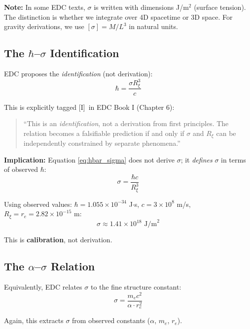 \documentclass[11pt,a4paper]{article}
\newcommand{\Ident}{\textsc{[I]}}
\begin{document}
\textbf{Note:} In some EDC texts, $\sigma$ is written with dimensions J/m$^2$
(surface tension). The distinction is whether we integrate over 4D spacetime
or 3D space. For gravity derivations, we use $[\sigma] = M/L^3$ in natural units.

\subsection{The $\hbar$--$\sigma$ Identification}

EDC proposes the \textit{identification} (not derivation):
\begin{equation}
\boxed{\hbar = \frac{\sigma R_\xi^3}{c}}
\label{eq:hbar_sigma}
\end{equation}

This is explicitly tagged \Ident\ in EDC Book I (Chapter 6):
\begin{quote}
``This is an \textit{identification}, not a derivation from first principles.
The relation becomes a falsifiable prediction if and only if $\sigma$ and
$R_\xi$ can be independently constrained by separate phenomena.''
\end{quote}

\textbf{Implication:} Equation \eqref{eq:hbar_sigma} does not derive $\sigma$;
it \textit{defines} $\sigma$ in terms of observed $\hbar$:
\begin{equation}
\sigma = \frac{\hbar c}{R_\xi^3}
\label{eq:sigma_from_hbar}
\end{equation}

Using observed values: $\hbar = 1.055 \times 10^{-34}$ J$\cdot$s,
$c = 3 \times 10^8$ m/s, $R_\xi = r_e = 2.82 \times 10^{-15}$ m:
\begin{equation}
\sigma \approx 1.41 \times 10^{18} \text{ J/m}^2
\end{equation}

This is \textbf{calibration}, not derivation.

\subsection{The $\alpha$--$\sigma$ Relation}

Equivalently, EDC relates $\sigma$ to the fine structure constant:
\begin{equation}
\sigma = \frac{m_e c^2}{\alpha \cdot r_e^2}
\label{eq:sigma_from_alpha}
\end{equation}

Again, this extracts $\sigma$ from observed constants ($\alpha$, $m_e$, $r_e$).
\end{document}
